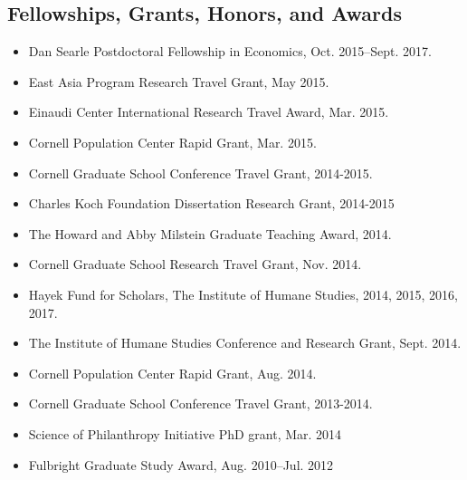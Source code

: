\documentclass[margin]{res}
\begin{document}
\begin{resume}
\section{Fellowships, Grants, Honors, and Awards}
\begin{itemize}
\item Dan Searle Postdoctoral Fellowship in Economics, Oct. 2015--Sept. 2017.
\item East Asia Program Research Travel Grant, May 2015.
\item Einaudi Center International Research Travel Award, Mar. 2015.
\item Cornell Population Center Rapid Grant, Mar. 2015.
\item Cornell Graduate School Conference Travel Grant, 2014-2015.
\item Charles Koch Foundation Dissertation Research Grant, 2014-2015
\item The Howard and Abby Milstein Graduate Teaching Award, 2014.
\item Cornell Graduate School Research Travel Grant, Nov. 2014.
\item Hayek Fund for Scholars, The Institute of Humane Studies, 2014, 2015, 2016, 2017.
\item The Institute of Humane Studies Conference and Research Grant, Sept. 2014.
\item Cornell Population Center Rapid Grant, Aug. 2014.
\item Cornell Graduate School Conference Travel Grant, 2013-2014.
\item Science of Philanthropy Initiative PhD grant, Mar. 2014
\item Fulbright Graduate Study Award, Aug. 2010--Jul. 2012
\end{itemize}

\end{resume}
\end{document}
